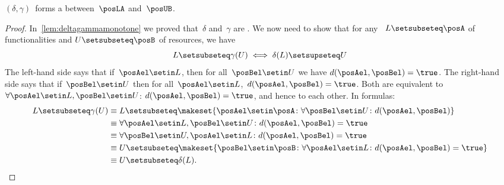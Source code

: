 {    \begin{lemma}\label{lem:deltagamma-monotone-galois}
        $(\delta, \gamma)$~forms a  between~$\posLA$ and~$\posUB$.
    \end{lemma}
    \begin{proof}
        In~\cref{lem:deltagammamonotone} we proved that~$\delta$ and~$\gamma$ are .
        We now need to show that for any ~$L\setsubseteq \posA$ of functionalities and  $U\setsubseteq \posB$ of resources, we have
        \begin{equation}
            L\setsubseteq\gamma(U) \iff \delta(L)\setsupseteq U
        \end{equation}
        The left-hand side says that if~$\posAel\setin L$, then for all~$\posBel \setin U$ we have $d(\posAel,\posBel)=\true$.
        The right-hand side says that if~$\posBel\setin U$ then for all~$\posAel \setin L$,~$d(\posAel,\posBel)=\true$.
        Both are equivalent to~$\forall \posAel\setin L,\posBel\setin U$: $d(\posAel,\posBel)=\true$, and hence to each other.
        In formulas:
        \begin{equation}
            \begin{aligned}
                L \setsubseteq \gamma(U) & \equiv L\setsubseteq \makeset{\posAel \setin \posA\colon \forall \posBel\setin U\colon d(\posAel,\posBel)} \\
                                         & \equiv \forall \posAel\setin L, \posBel\setin U \colon d(\posAel,\posBel)=\true \\
                                         & \equiv \forall \posBel\setin U, \posAel\setin L \colon d(\posAel,\posBel)=\true \\
                                         & \equiv U\setsubseteq \makeset{\posBel\setin \posB\colon \forall \posAel\setin L\colon d(\posAel,\posBel)=\true } \\
                                         & \equiv U\setsubseteq \delta(L).
            \end{aligned}
        \end{equation}
    \end{proof}
}
